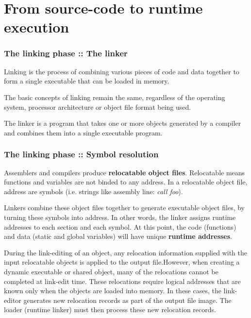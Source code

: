 %
%

\section{From source-code to runtime execution}


\begin{frame}
  \frametitle{The linking phase :: The linker}

Linking is the process of combining various pieces of code and data together
to form a single executable that can be loaded in memory. 

\-

The basic concepts of linking remain the same, regardless of the operating system,
processor architecture or object file format being used.

\-

The linker is a program that takes one or more objects generated by a compiler and combines them
into a single executable program.

\end{frame}


\begin{frame}
  \frametitle{The linking phase :: Symbol resolution}

Assemblers and compilers produce \textbf{relocatable object files}. Relocatable means functions 
and variables are not binded to any address. In a relocatable object file, address are symbols
(i.e. strings like assembly line: \textit{call foo}).

\-

Linkers combine these object files together to generate executable object files, by
turning these symbols into address. In other words, the linker assigns runtime
addresses to each section and each symbol. At this point, the code (functions) and data
(static and global variables) will have unique \textbf{runtime addresses}.

\-

During the link-editing of an object, any relocation information supplied with the input
relocatable objects is applied to the output file.However, when creating a dynamic executable or
shared object, many of the relocations cannot be completed at link-edit time. These relocations
require logical addresses that are known only when the objects are loaded into memory. In these
cases, the link-editor generates new relocation records as part of the output file image. The
loader (runtime linker) must then process these new relocation records.


\end{frame}

